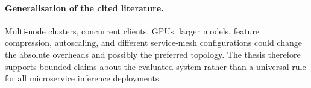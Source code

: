 \paragraph{Generalisation of the cited literature.}
Multi-node clusters, concurrent clients, GPUs, larger models, feature
compression, autoscaling, and different service-mesh configurations could
change the absolute overheads and possibly the preferred topology. The
thesis therefore supports bounded claims about the evaluated system rather
than a universal rule for all microservice inference deployments.
